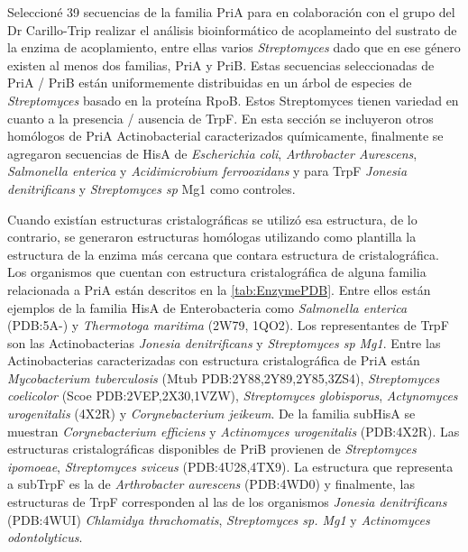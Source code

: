 \documentclass[12pt,twoside]{reedthesis}
\begin{document}
{  Seleccioné 39 secuencias de la familia PriA para en colaboración con el
  grupo del Dr Carillo-Trip realizar el análisis bioinformático de
  acoplameinto del sustrato de la enzima de acoplamiento, entre ellas
  varios \emph{Streptomyces} dado que en ese género existen al menos dos
  familias, PriA y PriB. Estas secuencias seleccionadas de PriA / PriB
  están uniformemente distribuidas en un árbol de especies de
  \emph{Streptomyces} basado en la proteína RpoB. Estos Streptomyces
  tienen variedad en cuanto a la presencia / ausencia de TrpF. En esta
  sección se incluyeron otros homólogos de PriA Actinobacterial
  caracterizados químicamente, finalmente se agregaron secuencias de HisA
  de \emph{Escherichia coli}, \emph{Arthrobacter Aurescens},
  \emph{Salmonella enterica} y \emph{Acidimicrobium ferrooxidans} y para
  TrpF \emph{Jonesia denitrificans} y \emph{Streptomyces sp } Mg1 como
  controles.
  
  Cuando existían estructuras cristalográficas se utilizó esa estructura,
  de lo contrario, se generaron estructuras homólogas utilizando como
  plantilla la estructura de la enzima más cercana que contara estructura
  de cristalográfica. Los organismos que cuentan con estructura
  cristalográfica de alguna familia relacionada a PriA están descritos en
  la \autoref{tab:EnzymePDB}. Entre ellos están ejemplos de la familia
  HisA de Enterobacteria como \emph{Salmonella enterica} (PDB:5A-) y
  \emph{Thermotoga maritima} (2W79, 1QO2). Los representantes de TrpF son
  las Actinobacterias \emph{Jonesia denitrificans} y \emph{Streptomyces sp
  Mg1}. Entre las Actinobacterias caracterizadas con estructura
  cristalográfica de PriA están \emph{Mycobacterium tuberculosis} (Mtub
  PDB:2Y88,2Y89,2Y85,3ZS4), \emph{Streptomyces coelicolor} (Scoe
  PDB:2VEP,2X30,1VZW), \emph{Streptomyces globisporus}, \emph{Actynomyces
  urogenitalis} (4X2R) y \emph{Corynebacterium jeikeum}. De la familia
  subHisA se muestran \emph{Corynebacterium efficiens} y \emph{Actinomyces
  urogenitalis} (PDB:4X2R). Las estructuras cristalográficas disponibles
  de PriB provienen de \emph{Streptomyces ipomoeae}, \emph{Streptomyces
  sviceus} (PDB:4U28,4TX9). La estructura que representa a subTrpF es la
  de \emph{Arthrobacter aurescens} (PDB:4WD0) y finalmente, las
  estructuras de TrpF corresponden al las de los organismos \emph{Jonesia
  denitrificans} (PDB:4WUI) \emph{Chlamidya thrachomatis},
  \emph{Streptomyces sp. Mg1} y \emph{Actinomyces odontolyticus}.
  
  \clearpage  
  
}
\end{document}
